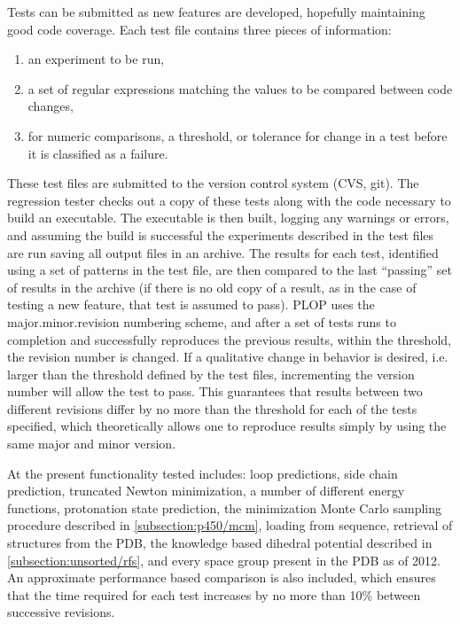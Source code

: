 Tests can be submitted as new features are developed, hopefully maintaining good code coverage.
Each test file contains three pieces of information:
\begin{enumerate}
\item an experiment to be run,
\item a set of regular expressions matching the values to be compared between code changes,
\item for numeric comparisons, a threshold, or tolerance for change in a test before it is classified as a failure.
\end{enumerate}
These test files are submitted to the version control system (CVS, git).
The regression tester checks out a copy of these tests along with the code necessary to build an executable.
The executable is then built, logging any warnings or errors, and assuming the build is successful the experiments described in the test files are run saving all output files in an archive.
The results for each test, identified using a set of patterns in the test file, are then compared to the last ``passing'' set of results in the archive (if there is no old copy of a result, as in the case of testing a new feature, that test is assumed to pass).
PLOP uses the major.minor.revision numbering scheme, and after a set of tests runs to completion and successfully reproduces the previous results, within the threshold, the revision number is changed.
If a qualitative change in behavior is desired, i.e. larger than the threshold defined by the test files, incrementing the version number will allow the test to pass.
This guarantees that results between two different revisions differ by no more than the threshold for each of the tests specified, which theoretically allows one to reproduce results simply by using the same major and minor version.

At the present functionality tested includes: loop predictions, side chain prediction, truncated Newton minimization, a number of different energy functions, protonation state prediction, the minimization Monte Carlo sampling procedure described in \ref{subsection:p450/mcm}, loading from sequence, retrieval of structures from the PDB, the knowledge based dihedral potential described in \ref{subsection:unsorted/rfs}, and every space group present in the PDB as of 2012.
An approximate performance based comparison is also included, which ensures that the time required for each test increases by no more than 10\% between successive revisions.

